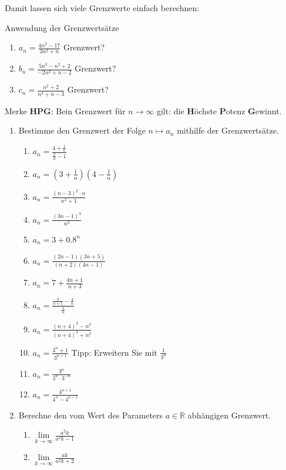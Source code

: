 Damit lassen sich viele Grenzwerte einfach berechnen:
\begin{bsp}{Anwendung der Grenzwertsätze}{}
	\begin{enumerate}
		\item $a_n=\frac{4n^2-17}{3n^2+n}$ Grenzwert? \vspace{3.5cm}
		\item $b_n=\frac{5n^3-n^2+2}{-2n^2+n-2}$ Grenzwert? \vspace{3.5cm}
		\item $c_n=\frac{n^2+2}{n^4+n-3}$ Grenzwert? \vspace{3.5cm}
	\end{enumerate}
\end{bsp}

Merke \textbf{HPG}: Bein Grenzwert für $n\to\infty$ gilt: die \glqq \textbf{H}öchste \textbf{P}otenz \textbf{G}ewinnt\grqq.
\clearpage
\begin{ueb}{}{}
	\begin{enumerate}
		\item Bestimme den Grenzwert der Folge $n \mapsto a_n$ mithilfe der Grenzwertsätze.

		      \begin{enumerate}
			      \item $a_n = \frac{4 + \frac{1}{n}}{\frac{2}{n}-1}$
			      \item $a_n = \left(3 + \frac{1}{n}\right)(4 - \frac{1}{n})$
			      \item $a_n = \frac{(n - 3)^2 \cdot n}{n^2 + 1}$
			      \item $a_n = \frac{(3n - 1)^3}{n^3}$
			      \item $a_n = 3 + 0.8^n$
			      \item $a_n = \frac{(2n - 1)(3n + 5)}{(n + 2)(4n - 1)}$
			      \item $a_n = 7 + \frac{4n + 1}{n + 3}$
			      \item $a_n = \frac{\frac{3}{n+1} - \frac{4}{n}}{\frac{1}{n}}$
			      \item $a_n = \frac{(n + 4)^3 - n^3}{(n + 4)^3 + n^3}$
			      \item $a_n = \frac{3^n + 1}{3^{n+1}}$ Tipp: Erweitern Sie mit $\frac{1}{3^n}$
			      \item $a_n = \frac{3^n}{3^n \cdot 3^{-n}}$
			      \item $a_n = \frac{4^{n+1}}{4^n - 4^{n-1}}$
		      \end{enumerate}
		\item Berechne den vom Wert des Parameters $a \in \mathbb{R}$ abhängigen Grenzwert.

		      \begin{enumerate}
			      \item $\lim\limits_{k \to \infty} \frac{a^2 k}{a^2 k - 1}$
			      \item $\lim\limits_{k \to \infty} \frac{a k}{a^2 k + 2}$
		      \end{enumerate}
	\end{enumerate}
\end{ueb}

